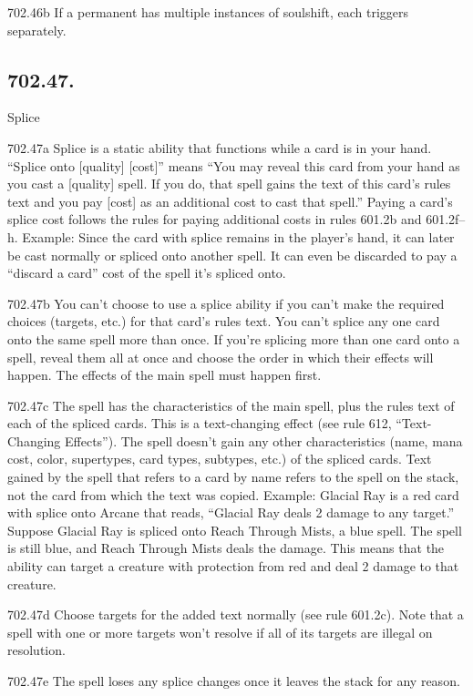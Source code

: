 702.46b If a permanent has multiple instances of soulshift, each triggers separately.

\subsection*{702.47.}
Splice

702.47a Splice is a static ability that functions while a card is in your hand. “Splice onto [quality] [cost]” means “You may reveal this card from your hand as you cast a [quality] spell. If you do, that spell gains the text of this card’s rules text and you pay [cost] as an additional cost to cast that spell.” Paying a card’s splice cost follows the rules for paying additional costs in rules 601.2b and 601.2f–h.
Example: Since the card with splice remains in the player’s hand, it can later be cast normally or spliced onto another spell. It can even be discarded to pay a “discard a card” cost of the spell it’s spliced onto.

702.47b You can’t choose to use a splice ability if you can’t make the required choices (targets, etc.) for that card’s rules text. You can’t splice any one card onto the same spell more than once. If you’re splicing more than one card onto a spell, reveal them all at once and choose the order in which their effects will happen. The effects of the main spell must happen first.

702.47c The spell has the characteristics of the main spell, plus the rules text of each of the spliced cards. This is a text-changing effect (see rule 612, “Text-Changing Effects”). The spell doesn’t gain any other characteristics (name, mana cost, color, supertypes, card types, subtypes, etc.) of the spliced cards. Text gained by the spell that refers to a card by name refers to the spell on the stack, not the card from which the text was copied.
Example: Glacial Ray is a red card with splice onto Arcane that reads, “Glacial Ray deals 2 damage to any target.” Suppose Glacial Ray is spliced onto Reach Through Mists, a blue spell. The spell is still blue, and Reach Through Mists deals the damage. This means that the ability can target a creature with protection from red and deal 2 damage to that creature.

702.47d Choose targets for the added text normally (see rule 601.2c). Note that a spell with one or more targets won’t resolve if all of its targets are illegal on resolution.

702.47e The spell loses any splice changes once it leaves the stack for any reason.

